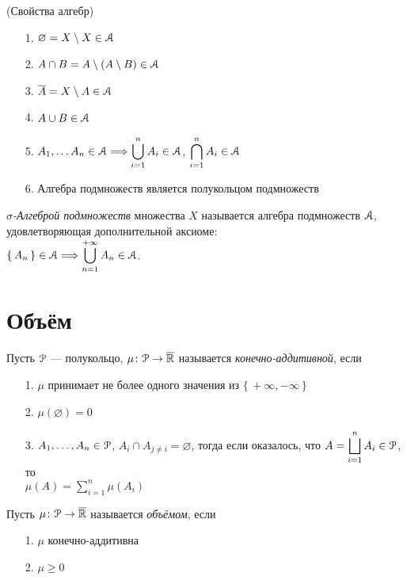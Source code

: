 \begin{theorem}(Свойства алгебр)
    \begin{itemize}
        \item[1.] $\varnothing = X \setminus X \in \mathcal{A}$
        \item[2.] $A \cap B = A \setminus (A \setminus B) \in \mathcal{A}$
        \item[3.] $\overline{A} = X \setminus A \in \mathcal{A}$
        \item[4.] $A \cup B \in \mathcal{A}$
        \item[5.] $\displaystyle A_1, \ldots A_n \in \mathcal{A} \Longrightarrow \bigcup_{i = 1}^{n}{A_i} \in
        \mathcal{A}$, $\displaystyle \bigcap_{i = 1}^{n}{A_i} \in \mathcal{A}$
        \item[6.] Алгебра подмножеств является полукольцом подмножеств
    \end{itemize}
\end{theorem}

\begin{definition}
    \textit{$\sigma$-Алгеброй подмножеств} множества $X$ называется алгебра
    подмножеств $\mathcal{A}$, удовлетворяющая дополнительной аксиоме: \\
    $\displaystyle \{\,A_n\,\} \in \mathcal{A} \Longrightarrow \bigcup_{n = 1}^{+\infty}{A_n} \in \mathcal{A}$.
\end{definition}

\section{Объём}

\begin{definition}
    Пусть $\mathcal{P}$ --- полукольцо, $\mu \colon \mathcal{P} \to \overline{\mathbb{R}}$ называется
    \textit{конечно-аддитивной}, если
    \begin{itemize}
        \item[1.] $\mu$ принимает не более одного значения из $\{\,+\infty, -\infty\,\}$
        \item[2.] $\mu(\varnothing) = 0$
        \item[3.] $A_1, \ldots, A_n \in \mathcal{P}$, $A_i \cap A_{j \neq i} = \varnothing$,
        тогда если оказалось, что $\displaystyle A = \bigsqcup_{i = 1}^{n}{A_i} \in \mathcal{P}$,
        то \\ $\displaystyle \mu(A) = \sum_{i = 1}^{n}{\mu(A_i)}$
    \end{itemize}
\end{definition}

\begin{definition}
    Пусть $\mu \colon \mathcal{P} \to \overline{\mathbb{R}}$ называется \textit{объёмом}, если
    \begin{itemize}
        \item[1.] $\mu$ конечно-аддитивна
        \item[2.] $\mu \geqslant 0$
    \end{itemize}
\end{definition}

